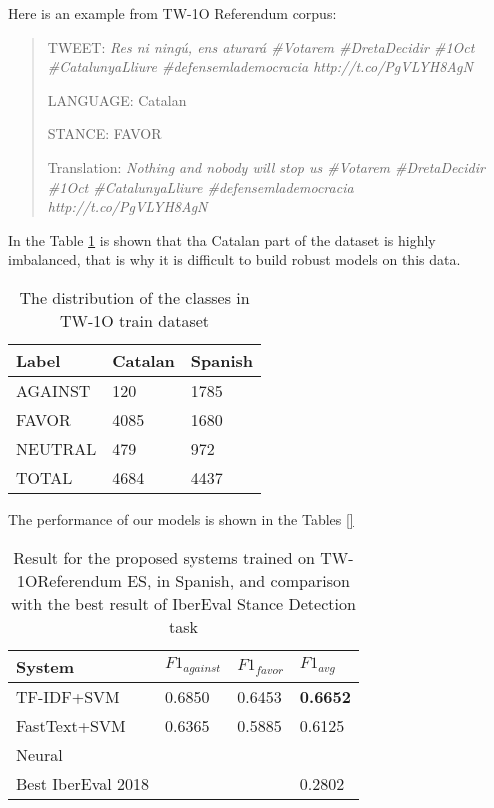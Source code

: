 \documentclass[10pt, a4paper]{article}
\begin{document}
Here is an example from TW-1O Referendum corpus: 

\begin{quote}
TWEET: \textit{Res ni ning\'u, ens aturar\'a \#Votarem \#DretaDecidir \#1Oct \#CatalunyaLliure \#defensemlademocracia http://t.co/PgVLYH8AgN }

LANGUAGE: Catalan 

STANCE: FAVOR

Translation: \textit{Nothing and nobody will stop us \#Votarem \#DretaDecidir \#1Oct \#CatalunyaLliure \#defensemlademocracia http://t.co/PgVLYH8AgN}
\end{quote}

In the Table \ref{tab:twdatasetdistr} is shown that tha Catalan part of the dataset is highly imbalanced, that is why it is difficult to build robust models on this data.  

\begin{table}[!h]
\begin{center}
\begin{tabularx}{\columnwidth}{|l|l|X|}

      \hline
      Label&Catalan&Spanish\\
      \hline
    AGAINST & 120&1785\\
      \hline
      FAVOR & 4085&1680\\
      \hline
     NEUTRAL & 479&972\\
      \hline
      TOTAL & 4684&4437\\
      \hline

\end{tabularx}
\caption{The distribution of the classes in TW-1O train dataset}
 \end{center}
 \label{tab:twdatasetdistr}
\end{table}

The performance of our models is shown in the Tables \ref{} 

\begin{table}[h]
\begin{center}
\begin{tabularx}{\columnwidth}{|l|l|l|X|}

\hline
System &$F1_{against}$&$F1_{favor}$&$F1_{avg}$\\ 
\hline
TF-IDF+SVM &0.6850& 0.6453&\textbf{0.6652}\\ 
\hline
FastText+SVM&0.6365&0.5885&0.6125\\ 
\hline
Neural     & &   &  \\
\hline
Best IberEval 2018 &  & &0.2802\\ 
\hline

\end{tabularx}
\caption{Result for the proposed systems trained on TW-1OReferendum ES, in Spanish, and comparison with the best result of IberEval Stance Detection task}
    \end{center}
    \label{tab:result_tw1o_es}
\end{table}
\end{document}
